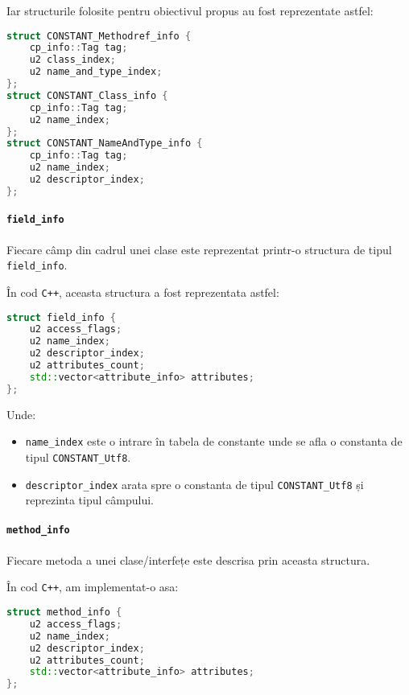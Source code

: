 Iar structurile folosite pentru obiectivul propus au fost reprezentate
astfel:

\begin{lstlisting}[language=C++]
struct CONSTANT_Methodref_info {
    cp_info::Tag tag;
    u2 class_index;
    u2 name_and_type_index;
};
struct CONSTANT_Class_info {
    cp_info::Tag tag;
    u2 name_index;
};
struct CONSTANT_NameAndType_info {
    cp_info::Tag tag;
    u2 name_index;
    u2 descriptor_index;
};
\end{lstlisting}

\paragraph{\texorpdfstring{\texttt{field\_info}}{field\_info}}\label{field_info}

Fiecare câmp din cadrul unei clase este reprezentat printr-o structura
de tipul \texttt{field\_info}.

În cod \texttt{C++}, aceasta structura a fost reprezentata astfel:

\begin{lstlisting}[language=C++]
struct field_info {
    u2 access_flags;
    u2 name_index;
    u2 descriptor_index;
    u2 attributes_count;
    std::vector<attribute_info> attributes;
};
\end{lstlisting}

Unde:
\begin{itemize}
	\item \texttt{name\_index} este o intrare în tabela de constante unde se afla o constanta de tipul \texttt{CONSTANT\_Utf8}.
	\item \texttt{descriptor\_index} arata spre o constanta de tipul \texttt{CONSTANT\_Utf8} și reprezinta tipul câmpului.
\end{itemize}

\paragraph{\texorpdfstring{\texttt{method\_info}}{method\_info}}\label{method_info}

Fiecare metoda a unei clase/interfețe este descrisa prin aceasta
structura.

În cod \texttt{C++}, am implementat-o asa:

\begin{lstlisting}[language=C++]
struct method_info {
    u2 access_flags;
    u2 name_index;
    u2 descriptor_index;
    u2 attributes_count;
    std::vector<attribute_info> attributes;
};
\end{lstlisting}

